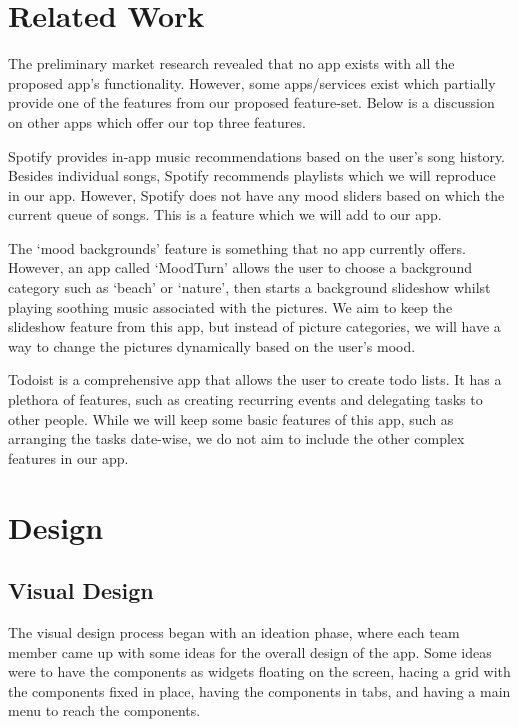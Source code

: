\documentclass[conference]{IEEEtran}
\begin{document}
\section{Related Work}


The preliminary market research revealed that no app exists with all the proposed app’s functionality. However, some apps/services exist which partially provide one of the features from our proposed feature-set. Below is a discussion on other apps which offer our top three features.

Spotify provides in-app music recommendations based on the user’s song history. Besides individual songs, Spotify recommends playlists which we will reproduce in our app. However, Spotify does not have any mood sliders based on which the current queue of songs. This is a feature which we will add to our app. 

The ‘mood backgrounds’ feature is something that no app currently offers. However, an app called ‘MoodTurn’ allows the user to choose a background category such as ‘beach’ or ‘nature’, then starts a background slideshow whilst playing soothing music associated with the pictures. We aim to keep the slideshow feature from this app, but instead of picture categories, we will have a way to change the pictures dynamically based on the user’s mood. 

Todoist is a comprehensive app that allows the user to create todo lists. It has a plethora of features, such as creating recurring events and delegating tasks to other people. While we will keep some basic features of this app, such as arranging the tasks date-wise, we do not aim to include the other complex features in our app.


\section{Design}
\subsection{Visual Design}
The visual design process began with an ideation phase, where each team member came up with some ideas for the overall design of the app. Some ideas were to have the components as widgets floating on the screen, hacing a grid with the components fixed in place, having the components in tabs, and having a main menu to reach the components. 
\end{document}
